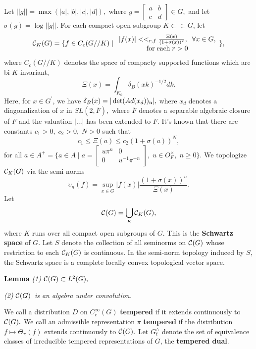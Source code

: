 Let $||g||=\max (|a|,|b|,|c|,|d|),$ where $g=\left[ 
\begin{array}{cc}
a & b \\ 
c & d
\end{array}
\right] \in G,$ and let $\sigma (g)=\log ||g||.$ For each compact open
subgroup $K\subset \subset G$, let 
\[
{\cal C}_K(G)=\{f\in C_c(G//K)\;|\; 
\begin{array}{c}
|f(x)|<<_{r,f}\frac{\Xi (x)}{(1+\sigma (x))^r},\;\;\forall x\in G, \\ 
{\rm for\;each}\;r>0
\end{array}
\}, 
\]
where $C_c(G//K)$ denotes the space of compacty supported functions which
are bi-$K$-invariant, 
\[
\Xi (x)=\int_{K_0}\delta _B(xk)^{-1/2}dk. 
\]
Here, for $x\in G^{\prime }$, we have $\delta _B(x)=|\det (Ad(x_d))_{{\frak n%
}}|,$ where $x_d$ denotes a diagonalization of $x$ in $SL(2,\overline{F}),$
where $\overline{F}$ denotes a separable algebraic closure of $F$ and the
valuation $|...|$ has been extended to $\overline{F}$. It's known that there
are constants $c_1>0,\;c_2>0,\;N>0$ such that 
\[
c_1\leq \Xi (a)\leq c_2(1+\sigma (a))^N, 
\]
for all $a\in A^{+}=\{a\in A\;|\;a=\left[ 
\begin{array}{cc}
u\pi ^n & 0 \\ 
0 & u^{-1}\pi ^{-n}
\end{array}
\right] ,\;u\in O_F^{\times },\;n\geq 0\}.$ We topologize ${\cal C}_K(G)$
via the semi-norms 
\[
\upsilon _n(f)=\sup_{x\in G}|f(x)|\frac{(1+\sigma (x))^n}{\Xi (x)}. 
\]
Let 
\[
{\cal C}(G)=\bigcup_K{\cal C}_K(G), 
\]
where $K$ runs over all compact open subgroups of $G$. This is the {\bf %
Schwartz space} of $G$. Let $S$ denote the collection of all seminorms on $%
{\cal C}(G)$ whose restriction to each ${\cal C}_K(G)$ is continuous. In the
semi-norm topology induced by $S$, the Schwartz space is a complete locally
convex topological vector space.

{\bf Lemma} {\em (1) }${\cal C}(G)\subset L^2(G),$

{\em (2) }${\cal C}(G)${\em \ is an algebra under convolution.}

We call a distribution $D$ on $C_c^\infty (G)$ {\bf tempered} if it extends
continuously to ${\cal C}(G).$ We call an admissible representation $\pi $ 
{\bf tempered} if the distribution $f\longmapsto \Theta _\pi (f)$ extends
continuously to ${\cal C}(G).$ Let $G_t^{\wedge }$ denote the set of
equivalence classes of irreducible tempered representations of $G$, the {\bf %
tempered dual}.

